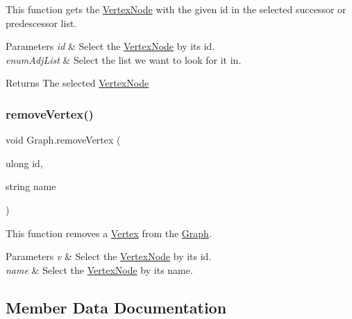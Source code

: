 This function gets the \hyperlink{classVertexNode}{Vertex\+Node} with the given id in the selected successor or predescessor list. 


\begin{DoxyParams}{Parameters}
{\em id} & Select the \hyperlink{classVertexNode}{Vertex\+Node} by its id.\\
\hline
{\em enum\+Adj\+List} & Select the list we want to look for it in.\\
\hline
\end{DoxyParams}
\begin{DoxyReturn}{Returns}
The selected \hyperlink{classVertexNode}{Vertex\+Node}
\end{DoxyReturn}
\mbox{\label{classGraph_a79c17a671d86709b585bcdd614533123}} 
\subsubsection{\texorpdfstring{remove\+Vertex()}{removeVertex()}}
{\footnotesize\ttfamily void Graph.\+remove\+Vertex (\begin{DoxyParamCaption}\item[{ulong}]{id,  }\item[{string}]{name }\end{DoxyParamCaption})\hspace{0.3cm}{\ttfamily [inline]}}



This function removes a \hyperlink{structVertex}{Vertex} from the \hyperlink{classGraph}{Graph}. 


\begin{DoxyParams}{Parameters}
{\em v} & Select the \hyperlink{classVertexNode}{Vertex\+Node} by its id.\\
\hline
{\em name} & Select the \hyperlink{classVertexNode}{Vertex\+Node} by its name.\\
\hline
\end{DoxyParams}


\subsection{Member Data Documentation}
\mbox{\label{classGraph_afc3634d5014c815235e5af25b4580362}} 

